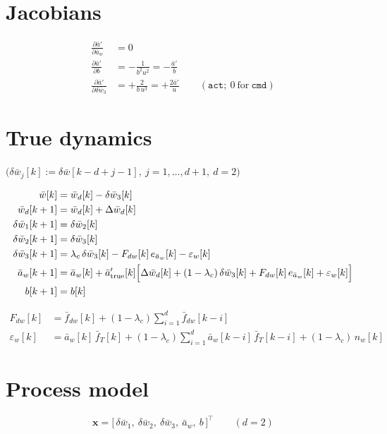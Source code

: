 \documentclass[11pt,a4paper,fontset=none]{ctexart}
\newcommand{\ba}{\bar{a}}
\newcommand{\bw}{\bar{w}}
\begin{document}
\section{Jacobians}

\begin{align*}
\frac{\partial \ba'}{\partial \ba_w}      &= 0 \\
\frac{\partial \ba'}{\partial b}          &= -\frac{1}{b^{2}u^{2}} = -\frac{\ba'}{b} \\
\frac{\partial \ba'}{\partial \delta\bw_3} &= +\frac{2}{b\,u^{3}} = +\frac{2\ba'}{u}
  \qquad (\texttt{act}; \ 0 \ \text{for} \ \texttt{cmd})
\end{align*}

\section{True dynamics}

$\bigl(\delta\bw_j[k] := \delta\bw[k-d+j-1],\ j = 1,\dots,d+1,\ d = 2\bigr)$

\begin{align*}
\bw[k]           &= \bw_d[k] - \delta\bw_3[k] \\
\bw_d[k+1]       &= \bw_d[k] + \Delta\bw_d[k] \\
\delta\bw_1[k+1] &= \delta\bw_2[k] \\
\delta\bw_2[k+1] &= \delta\bw_3[k] \\
\delta\bw_3[k+1] &= \lambda_c\,\delta\bw_3[k] - F_{dw}[k]\,e_{\ba_w}[k]
                    - \varepsilon_w[k] \\
\ba_w[k+1]       &= \ba_w[k] + \ba'_{\mathrm{true}}[k]\Bigl[
                    \Delta\bw_d[k] + (1-\lambda_c)\,\delta\bw_3[k]
                    + F_{dw}[k]\,e_{\ba_w}[k] + \varepsilon_w[k]\Bigr] \\
b[k+1]           &= b[k]
\end{align*}

\begin{align*}
F_{dw}[k] &= \bar{f}_{dw}[k] + (1-\lambda_c)\sum_{i=1}^{d}\bar{f}_{dw}[k-i] \\
\varepsilon_w[k] &= \ba_w[k]\,\bar{f}_T[k]
  + (1-\lambda_c)\sum_{i=1}^{d}\ba_w[k-i]\,\bar{f}_T[k-i]
  + (1-\lambda_c)\,n_w[k]
\end{align*}

\section{Process model}

\begin{equation*}
\mathbf{x} = \bigl[\,\delta\bw_1,\ \delta\bw_2,\ \delta\bw_3,\ \ba_w,\ b\,\bigr]^{\top}
\qquad (d = 2)
\end{equation*}
\end{document}
